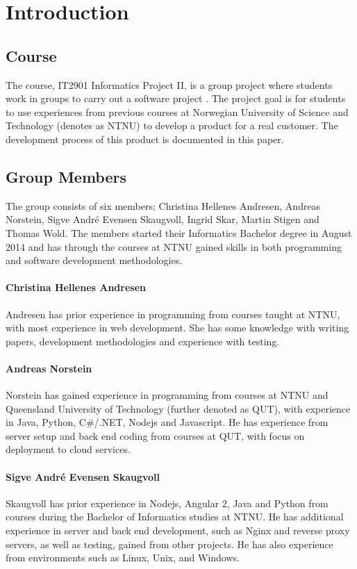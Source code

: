 
\chapter{Introduction}

\section{Course}
The course, IT2901 Informatics Project II, is a group project where students work in groups to carry out a software project \cite{EmneKode}. The project goal is for students to use experiences from previous courses at Norwegian University of Science and Technology (denotes as NTNU) to develop a product for a real customer. The development process of this product is documented in this paper.


\section{Group Members}
The group consists of six members; Christina Hellenes Andresen, Andreas Norstein, Sigve André Evensen Skaugvoll, Ingrid Skar, Martin Stigen and Thomas Wold. The members started their Informatics Bachelor degree in August 2014 and has through the courses at NTNU gained skills in both programming and software development methodologies.

\subsubsection{Christina Hellenes Andresen}
\label{christina}
Andresen has prior experience in programming from courses taught at NTNU, with most experience in web development. She has some knowledge with writing papers, development methodologies and experience with testing.

\subsubsection{Andreas Norstein}
Norstein has gained experience in programming from courses at NTNU and Queensland University of Technology (further denoted as QUT), with experience in Java, Python, C\#/.NET, Nodejs and Javascript. He has experience from server setup and back end coding from courses at QUT, with focus on deployment to cloud services. 

\subsubsection{Sigve André Evensen Skaugvoll}
\label{sigve}
Skaugvoll has prior experience in Nodejs, Angular 2, Java and Python from courses during the Bachelor of Informatics studies at NTNU. He has additional experience in server and back end development, such as Nginx and reverse proxy servers, as well as testing, gained from other projects. He has also experience from environments such as Linux, Unix, and Windows.

